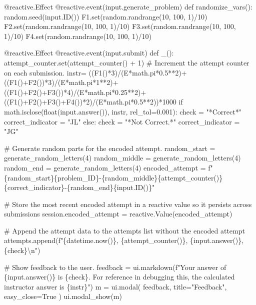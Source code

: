 \documentclass[
  letterpaper,
  DIV=11,
  numbers=noendperiod]{scrreprt}
\newenvironment{Shaded}{\begin{snugshade}}{\end{snugshade}}
\newcommand{\NormalTok}[1]{\textcolor[rgb]{0.00,0.23,0.31}{#1}}
\begin{document}
\begin{Shaded}
\begin{Highlighting}[]
\NormalTok{    @reactive.Effect}
\NormalTok{    @reactive.event(input.generate\_problem)}
\NormalTok{    def randomize\_vars():}
\NormalTok{        random.seed(input.ID())}
\NormalTok{        F1.set(random.randrange(10, 100, 1)/10)}
\NormalTok{        F2.set(random.randrange(10, 100, 1)/10)}
\NormalTok{        F3.set(random.randrange(10, 100, 1)/10)}
\NormalTok{        F4.set(random.randrange(10, 100, 1)/10)}
        

\NormalTok{    @reactive.Effect}
\NormalTok{    @reactive.event(input.submit)}
\NormalTok{    def \_():}
\NormalTok{        attempt\_counter.set(attempt\_counter() + 1)  \# Increment the attempt counter on each submission.}
\NormalTok{        instr= ((F1()*3)/(E*math.pi*0.5**2)+((F1()+F2())*3)/(E*math.pi*1**2)+((F1()+F2()+F3())*4)/(E*math.pi*0.25**2)+((F1()+F2()+F3()+F4())*2)/(E*math.pi*0.5**2))*1000}
\NormalTok{        if math.isclose(float(input.answer()), instr, rel\_tol=0.001):}
\NormalTok{            check = "*Correct*"}
\NormalTok{            correct\_indicator = "JL"}
\NormalTok{        else:}
\NormalTok{            check = "*Not Correct.*"}
\NormalTok{            correct\_indicator = "JG"}

\NormalTok{        \# Generate random parts for the encoded attempt.}
\NormalTok{        random\_start = generate\_random\_letters(4)}
\NormalTok{        random\_middle = generate\_random\_letters(4)}
\NormalTok{        random\_end = generate\_random\_letters(4)}
\NormalTok{        encoded\_attempt = f"\{random\_start\}\{problem\_ID\}{-}\{random\_middle\}\{attempt\_counter()\}\{correct\_indicator\}{-}\{random\_end\}\{input.ID()\}"}

\NormalTok{        \# Store the most recent encoded attempt in a reactive value so it persists across submissions}
\NormalTok{        session.encoded\_attempt = reactive.Value(encoded\_attempt)}

\NormalTok{        \# Append the attempt data to the attempts list without the encoded attempt}
\NormalTok{        attempts.append(f"\{datetime.now()\}, \{attempt\_counter()\}, \{input.answer()\}, \{check\}\textbackslash{}n")}

\NormalTok{        \# Show feedback to the user.}
\NormalTok{        feedback = ui.markdown(f"Your answer of \{input.answer()\} is \{check\}. For reference in debugging this, the calculated instructor answer is \{instr\}")}
\NormalTok{        m = ui.modal(}
\NormalTok{            feedback,}
\NormalTok{            title="Feedback",}
\NormalTok{            easy\_close=True}
\NormalTok{        )}
\NormalTok{        ui.modal\_show(m)}


\end{Highlighting}
\end{Shaded}
\end{document}
